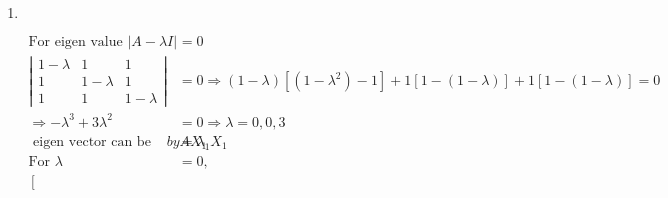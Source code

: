 \begin{enumerate}
\begin{answer}
\begin{align*}
\begin{array}{c}
	-\left(k_{1}+k_{2}\right) \\
	k_{1} \\
	k_{2}
	\end{array}\right] \text { if } k_{1}=k_{2}\\
	X_{1}&=k_{1}\left[\begin{array}{c}-2 \\ 1 \\ 1\end{array}\right]\text{ from orthogonality condition }X_{1}^{T} X_{1}=1 \Rightarrow k_{1}=\frac{1}{2}\\
	X_{1}&=\frac{1}{2}\left[\begin{array}{c}-2 \\ 1 \\ 1\end{array}\right]\\
	\text{For }\lambda&=-1\text{ similarly if }k_{1}=1, k_{2}=-1\\
	\text{Then }X_{2}=\left[\begin{array}{c}0 \\ 1 \\ -1\end{array}\right] \quad X_{2}&=\frac{1}{\sqrt{2}}\left[\begin{array}{c}0 \\ 1 \\ -1\end{array}\right]
		\end{align*}
	So the correct answer is \textbf{Option (a)}
	\end{answer}
	\item $\left. \right. $
	\begin{answer}
		\begin{align*}
		 \text{For eigen value }|A-\lambda I|&=0\\
		\left|\begin{array}{ccc}
		1-\lambda & 1 & 1 \\
		1 & 1-\lambda & 1 \\
		1 & 1 & 1-\lambda
		\end{array}\right|&=0 \Rightarrow(1-\lambda)\left[\left(1-\lambda^{2}\right)-1\right]+1[1-(1-\lambda)]+1[1-(1-\lambda)]=0\\
		\Rightarrow-\lambda^{3}+3 \lambda^{2}&=0 \Rightarrow \lambda=0,0,3\\
	\text{	eigen vector can be determine }by A X_{1}&=\lambda_{1} X_{1}\\
		\text{For }\lambda&=0,\\
		\left[\begin{array}{lll}

\end{array}
\end{align*}
\end{answer}
\end{enumerate}
